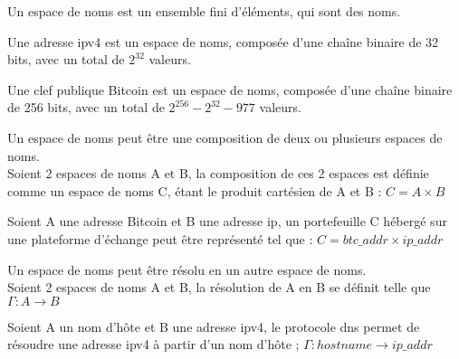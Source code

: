 \begin{definition}
    Un espace de noms est un ensemble fini d'éléments, qui sont des noms.
\end{definition}

\begin{example}
    Une adresse \acrshort{ip}v4 est un espace de noms,
    composée d'une chaîne binaire de 32 bits,
    avec un total de $2^{32}$ valeurs.
\end{example}

\begin{example}
    Une clef publique Bitcoin est un espace de noms, 
    composée d'une chaîne binaire de 256 bits, 
    avec un total de $2^{256} - 2^{32} - 977$ valeurs\cite{bitcoin_secp}.
\end{example}

\begin{proposition}[Composition]
    Un espace de noms peut être une composition de deux ou plusieurs 
    espaces de noms.\\
    Soient 2 espaces de noms A et B, la composition de ces 2 espaces 
    est définie comme un espace de noms C, étant le produit cartésien 
    de A et B : $C = A \times B$
\end{proposition}

\begin{example}
    Soient A une adresse Bitcoin et B une adresse \acrshort{ip}, 
    un portefeuille C hébergé sur une plateforme d'échange peut être représenté 
    tel que : $C = btc\_addr \times ip\_addr$ 
\end{example}

\begin{proposition}[Résolution]
    Un espace de noms peut être résolu en un autre espace de noms.\\
    Soient 2 espaces de noms A et B, la résolution de A en B se définit telle que 
    $\Gamma : A \longrightarrow B$
\end{proposition}

\begin{example}
    Soient A un nom d'hôte et B une adresse \acrshort{ip}v4, 
    le protocole \acrshort{dns} permet de résoudre une adresse \acrshort{ip}v4 
    à partir d'un nom d'hôte ; 
    $\Gamma : hostname \longrightarrow ip\_addr$
\end{example}

